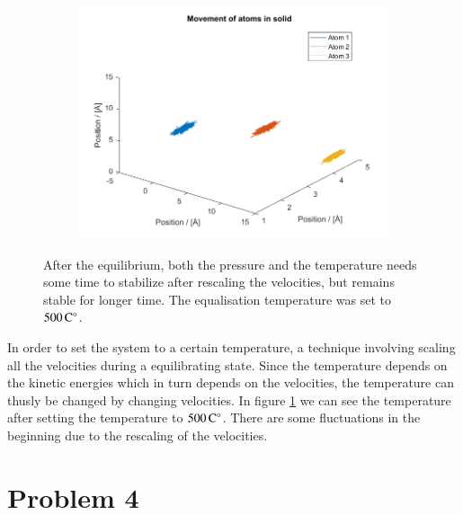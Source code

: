 \begin{figure}[H]
\begin{subfigure}[b]{0.40\textwidth}
        \includegraphics[width=\textwidth]{graphics/task3/traj.png}
    \end{subfigure}
    \caption{After the equilibrium, both the pressure and the temperature needs some time to stabilize after rescaling the velocities, but remains stable for longer time. The equalisation temperature was set to $\unit[500]{C^\circ}$.}
    \label{fig:equilibrium500}
\end{figure}

In order to set the system to a certain temperature, a technique involving scaling all the velocities during a equilibrating state. Since the temperature depends on the kinetic energies which in turn depends on the velocities, the  temperature can thusly be changed by changing velocities. In figure \ref{fig:equilibrium500} we can see the temperature after setting the temperature to $\unit[500]{C^\circ}$. There are some fluctuations in the beginning due to the rescaling of the velocities.
 

\section*{Problem 4}

